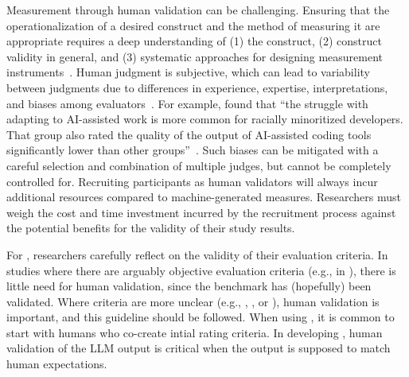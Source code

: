 Measurement through human validation can be challenging.
Ensuring that the operationalization of a desired construct and the method of measuring it are appropriate requires a deep understanding of (1) the construct, (2) construct validity in general, and (3) systematic approaches for designing measurement instruments~\cite{DBLP:journals/tse/SjobergB23}.
Human judgment is subjective, which can lead to variability between judgments due to differences in experience, expertise, interpretations, and biases among evaluators~\cite{DBLP:journals/pacmhci/McDonaldSF19}.
For example, \citeauthor{hicks_lee_foster-marks_2025} found that \enquote{the struggle with adapting to AI-assisted work is more common for racially minoritized developers.
That group also rated the quality of the output of AI-assisted coding tools significantly lower than other groups}~\cite{hicks_lee_foster-marks_2025}.
Such biases can be mitigated with a careful selection and combination of multiple judges, but cannot be completely controlled for.
Recruiting participants as human validators will always incur additional resources compared to machine-generated measures.
Researchers must weigh the cost and time investment incurred by the recruitment process against the potential benefits for the validity of their study results.


For \llmusage, researchers \should carefully reflect on the validity of their evaluation criteria.
In studies where there are arguably objective evaluation criteria (e.g., in \benchmarkingtasks), there is little need for human validation, since the benchmark has (hopefully) been validated.
Where criteria are more unclear (e.g., \annotators, \subjects, or \synthesis), human validation is important, and this guideline should be followed.
When using \judges, it is common to start with humans who co-create intial rating criteria. 
In developing \newtools, human validation of the LLM output is critical when the output is supposed to match human expectations.
